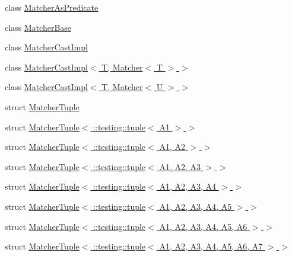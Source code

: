 \begin{DoxyCompactItemize}
class \hyperlink{classtesting_1_1internal_1_1_matcher_as_predicate}{Matcher\+As\+Predicate}
\item 
class \hyperlink{classtesting_1_1internal_1_1_matcher_base}{Matcher\+Base}
\item 
class \hyperlink{classtesting_1_1internal_1_1_matcher_cast_impl}{Matcher\+Cast\+Impl}
\item 
class \hyperlink{classtesting_1_1internal_1_1_matcher_cast_impl_3_01_t_00_01_matcher_3_01_t_01_4_01_4}{Matcher\+Cast\+Impl$<$ T, Matcher$<$ T $>$ $>$}
\item 
class \hyperlink{classtesting_1_1internal_1_1_matcher_cast_impl_3_01_t_00_01_matcher_3_01_u_01_4_01_4}{Matcher\+Cast\+Impl$<$ T, Matcher$<$ U $>$ $>$}
\item 
struct \hyperlink{structtesting_1_1internal_1_1_matcher_tuple}{Matcher\+Tuple}
\item 
struct \hyperlink{structtesting_1_1internal_1_1_matcher_tuple_3_01_1_1testing_1_1tuple_3_01_a1_01_4_01_4}{Matcher\+Tuple$<$ \+::testing\+::tuple$<$ A1 $>$ $>$}
\item 
struct \hyperlink{structtesting_1_1internal_1_1_matcher_tuple_3_01_1_1testing_1_1tuple_3_01_a1_00_01_a2_01_4_01_4}{Matcher\+Tuple$<$ \+::testing\+::tuple$<$ A1, A2 $>$ $>$}
\item 
struct \hyperlink{structtesting_1_1internal_1_1_matcher_tuple_3_01_1_1testing_1_1tuple_3_01_a1_00_01_a2_00_01_a3_01_4_01_4}{Matcher\+Tuple$<$ \+::testing\+::tuple$<$ A1, A2, A3 $>$ $>$}
\item 
struct \hyperlink{structtesting_1_1internal_1_1_matcher_tuple_3_01_1_1testing_1_1tuple_3_01_a1_00_01_a2_00_01_a3_00_01_a4_01_4_01_4}{Matcher\+Tuple$<$ \+::testing\+::tuple$<$ A1, A2, A3, A4 $>$ $>$}
\item 
struct \hyperlink{structtesting_1_1internal_1_1_matcher_tuple_3_01_1_1testing_1_1tuple_3_01_a1_00_01_a2_00_01_a3_00_01_a4_00_01_a5_01_4_01_4}{Matcher\+Tuple$<$ \+::testing\+::tuple$<$ A1, A2, A3, A4, A5 $>$ $>$}
\item 
struct \hyperlink{structtesting_1_1internal_1_1_matcher_tuple_3_01_1_1testing_1_1tuple_3_01_a1_00_01_a2_00_01_a3_0fb935efcf1b84fbc4f177777ca3392dc}{Matcher\+Tuple$<$ \+::testing\+::tuple$<$ A1, A2, A3, A4, A5, A6 $>$ $>$}
\item 
struct \hyperlink{structtesting_1_1internal_1_1_matcher_tuple_3_01_1_1testing_1_1tuple_3_01_a1_00_01_a2_00_01_a3_0064798126035aa0d3ca935c3449bf0c1}{Matcher\+Tuple$<$ \+::testing\+::tuple$<$ A1, A2, A3, A4, A5, A6, A7 $>$ $>$}
\item 

\end{DoxyCompactItemize}
